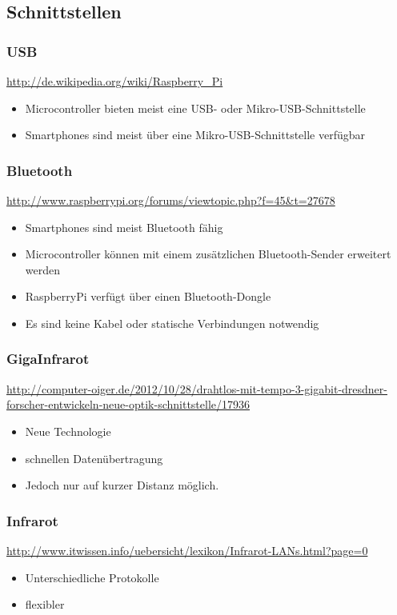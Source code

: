 \subsection{Schnittstellen}

\subsubsection{USB}
\url{http://de.wikipedia.org/wiki/Raspberry_Pi}
\begin{itemize}
    \item Microcontroller bieten meist eine USB- oder Mikro-USB-Schnittstelle
    \item Smartphones sind meist über eine Mikro-USB-Schnittstelle verfügbar
\end{itemize}

\subsubsection{Bluetooth}
\url{http://www.raspberrypi.org/forums/viewtopic.php?f=45&t=27678}
\begin{itemize}
    \item Smartphones sind meist Bluetooth fähig
    \item Microcontroller können mit einem zusätzlichen Bluetooth-Sender erweitert werden
    \item RaspberryPi verfügt über einen Bluetooth-Dongle
    \item Es sind keine Kabel oder statische Verbindungen notwendig
\end{itemize}

\subsubsection{GigaInfrarot}
\url{http://computer-oiger.de/2012/10/28/drahtlos-mit-tempo-3-gigabit-dresdner-forscher-entwickeln-neue-optik-schnittstelle/17936}
\begin{itemize}
    \item Neue Technologie
    \item schnellen Datenübertragung
    \item Jedoch nur auf kurzer Distanz möglich.
\end{itemize}

\subsubsection{Infrarot}
\url{http://www.itwissen.info/uebersicht/lexikon/Infrarot-LANs.html?page=0}
\begin{itemize}
    \item Unterschiedliche Protokolle
    \item flexibler
\end{itemize}


